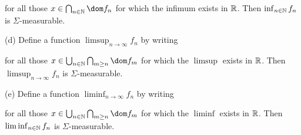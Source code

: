 \noindent for all those $x\in\bigcap_{n\in\Bbb N}\dom f_n$ for which the
infimum exists in $\Bbb R$.   Then $\inf_{n\in\Bbb N}f_n$ is
$\Sigma$-measurable.
     
(d) Define a function $\limsup_{n\to\infty}f_n$ by writing
     
     
\noindent for all those 
$x\in\bigcup_{n\in\Bbb N}\bigcap_{m\ge n}\dom f_m$ for which the 
$\limsup$ exists in $\Bbb R$.   Then $\limsup_{n\to\infty}f_n$ is
$\Sigma$-measurable.
     
(e) Define a function $\liminf_{n\to\infty}f_n$ by writing
     
     
\noindent for all those $x\in\bigcup_{n\in\Bbb N}\bigcap_{m\ge n}\dom
f_m$ for which the $\liminf$ exists in $\Bbb R$.   Then
$\liminf_{n\in\Bbb N}f_n$ is
$\Sigma$-measurable.
     
     
